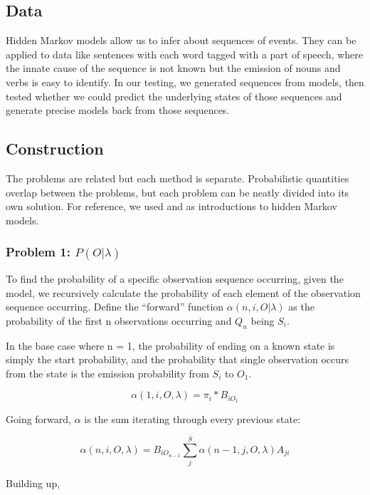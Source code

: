 \documentclass[11pt,a4paper]{article}
\begin{document}
\subsection{Data}
\label{Hidden Markov Models:Data}

Hidden Markov models allow us to infer about sequences of events. They can be applied to data like sentences with each word tagged with a part of speech, where the innate cause of the sequence is not known but the emission of nouns and verbs is easy to identify. In our testing, we generated sequences from models, then tested whether we could predict the underlying states of those sequences and generate precise models back from those sequences.

\subsection{Construction}
\label{Hidden Markov Models:Construction}

The problems are related but each method is separate. Probabilistic quantities overlap between the problems, but each problem can be neatly divided into its own solution. For reference, we used  and  as introductions to hidden Markov models.

\subsubsection{Problem 1: $P(O|\lambda)$}
\label{Hidden Markov Models:Problem 1}

To find the probability of a specific observation sequence occurring, given the model, we recursively calculate the probability of each element of the observation sequence occurring. Define the ``forward'' function $\alpha(n, i ,O|\lambda)$ as the probability of the first n observations occurring and $Q_n$ being $S_i$.

In the base case where n = 1, the probability of ending on a known state is simply the start probability, and the probability that single observation occurs from the state is the emission probability from $S_i$ to $O_1$.

\[
\alpha(1, i, O, \lambda) = \pi_i * B_{iO_1}
\]

Going forward, $\alpha$ is the sum iterating through every previous state:

\[
\alpha(n, i, O, \lambda) = B_{iO_{n-1}} \sum_j^S{\alpha(n - 1, j, O, \lambda)A_{ji}}
\]

Building up,
\end{document}
